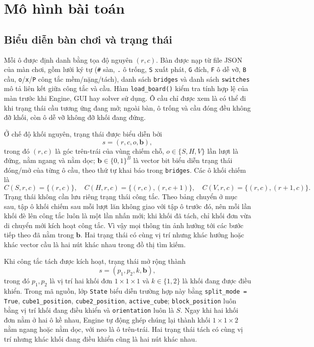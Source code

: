 \section{Mô hình bài toán}

\subsection{Biểu diễn bàn chơi và trạng thái}
Mỗi ô được định danh bằng tọa độ nguyên $(r,c)$. Bàn được nạp từ file JSON của màn chơi, gồm lưới ký tự (\texttt{\#} sàn, \texttt{.} ô trống, \texttt{S} xuất phát, \texttt{G} đích, \texttt{F} ô dễ vỡ, \texttt{B} cầu, \texttt{o}/\texttt{x}/\texttt{P} công tắc mềm/nặng/tách), danh sách \texttt{bridges} và danh sách \texttt{switches} mô tả liên kết giữa công tắc và cầu. Hàm \texttt{load\_board()} kiểm tra tính hợp lệ của màn trước khi Engine, GUI hay solver sử dụng. Ô cầu chỉ được xem là có thể đi khi trạng thái cầu tương ứng đang mở; ngoài bàn, ô trống và cầu đóng đều không đỡ khối, còn ô dễ vỡ không đỡ khối đang đứng.

Ở chế độ khối nguyên, trạng thái được biểu diễn bởi
\[
 s=(r,c,o,\mathbf{b}),
\]
trong đó $(r,c)$ là góc trên-trái của vùng chiếm chỗ, $o\in\{S,H,V\}$ lần lượt là đứng, nằm ngang và nằm dọc; $\mathbf{b}\in\{0,1\}^{B}$ là vector bit biểu diễn trạng thái đóng/mở của từng ô cầu, theo thứ tự khai báo trong \texttt{bridges}. Các ô khối chiếm là
\[
 C(S,r,c)=\{(r,c)\},\quad C(H,r,c)=\{(r,c),(r,c+1)\},\quad
 C(V,r,c)=\{(r,c),(r+1,c)\}.
\]
Trạng thái không cần lưu riêng trạng thái công tắc. Theo bảng chuyển ở mục sau, tập ô khối chiếm sau mỗi lượt lăn không giao với tập ô trước đó, nên mỗi lần khối đè lên công tắc luôn là một lần nhấn mới; khi khối đã tách, chỉ khối đơn vừa di chuyển mới kích hoạt công tắc. Vì vậy mọi thông tin ảnh hưởng tới các bước tiếp theo đã nằm trong $\mathbf{b}$. Hai trạng thái có cùng vị trí nhưng khác hướng hoặc khác vector cầu là hai nút khác nhau trong đồ thị tìm kiếm.

Khi công tắc tách được kích hoạt, trạng thái mở rộng thành
\[
 s=(p_1,p_2,k,\mathbf{b}),
\]
trong đó $p_1,p_2$ là vị trí hai khối đơn $1\times1\times1$ và $k\in\{1,2\}$ là khối đang được điều khiển. Trong mã nguồn, lớp \texttt{State} biểu diễn trường hợp này bằng \texttt{split\_mode = True}, \texttt{cube1\_position}, \texttt{cube2\_position}, \texttt{active\_cube}; \texttt{block\_position} luôn bằng vị trí khối đang điều khiển và \texttt{orientation} luôn là $S$. Ngay khi hai khối đơn nằm ở hai ô kề nhau, Engine tự động ghép chúng lại thành khối $1\times1\times2$ nằm ngang hoặc nằm dọc, với neo là ô trên-trái. Hai trạng thái tách có cùng vị trí nhưng khác khối đang điều khiển cũng là hai nút khác nhau.

